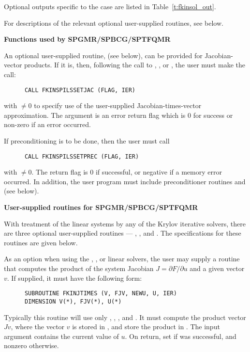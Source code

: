 \begin{Steps}
  Optional outputs specific to the {\sptfqmr} case are listed in
  Table~\ref{t:fkinsol_out}.

  For descriptions of the relevant optional user-supplied routines, see below.


  {\s}{\p} {\bf Functions used by SPGMR/SPBCG/SPTFQMR}

  An optional user-supplied routine,  (see below), can be provided for
  Jacobian-vector products.  If it is, then, following the call to
  , , or , the user must make the call:
\begin{verbatim}
      CALL FKINSPILSSETJAC (FLAG, IER)
\end{verbatim}
  with  $\neq 0$ to specify use of the user-supplied
  Jacobian-times-vector approximation.
  The argument  is an error return flag which is $0$ 
  for success or non-zero if an error occurred.
  
  If preconditioning is to be done, then the user must call
\begin{verbatim}
      CALL FKINSPILSSETPREC (FLAG, IER)
\end{verbatim}
  with  $\neq 0$.  The return flag  is 0 if
  successful, or negative if a memory error occurred.
  In addition, the user program must include
  preconditioner routines  and  (see below).


 {\s}{\p} {\bf User-supplied routines for SPGMR/SPBCG/SPTFQMR}

  With treatment of the linear systems by any of the Krylov iterative
  solvers, there are three optional user-supplied routines ---
  , , and .  The specifications
  for these routines are given below.

  As an option when using the {\spgmr}, {\spbcg}, or {\sptfqmr}  linear solvers, 
  the user may supply a routine that computes the product of the system Jacobian 
  $J = \partial F / \partial u$ 
  and a given vector $v$.  If supplied, it must have the following form:
\begin{verbatim}
      SUBROUTINE FKINJTIMES (V, FJV, NEWU, U, IER)
      DIMENSION V(*), FJV(*), U(*)
\end{verbatim}
  Typically this routine will use only , , , and
  .  It must compute the product vector $Jv$, where the vector $v$ is
  stored in , and store the product in .  
  The input argument  contains the current
  value of $u$.  On return, set
   if  was successful, and nonzero otherwise.


\end{Steps}
